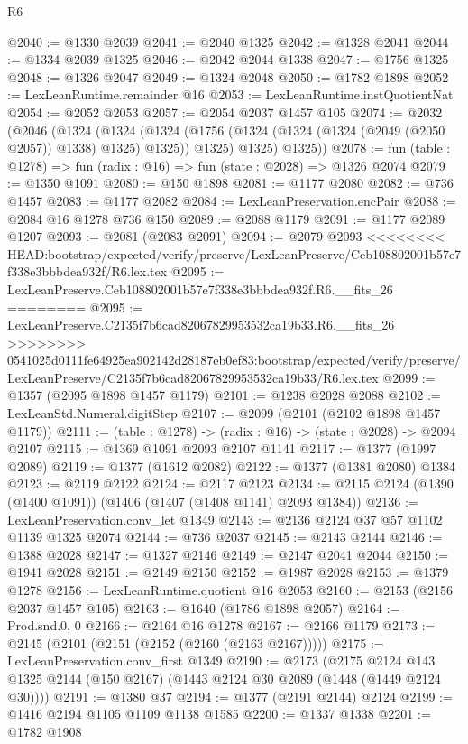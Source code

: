 \begin{lexlean}{R6}
\begin{coremodule}
{{{{{{{{{{{{{{{{{{{{{{{{{{{{{{{{{{{{{{{{{{{{{{{{{{@2040 := @1330 @2039
@2041 := @2040 @1325
@2042 := @1328 @2041
@2044 := @1334 @2039 @1325
@2046 := @2042 @2044 @1338
@2047 := @1756 @1325
@2048 := @1326 @2047
@2049 := @1324 @2048
@2050 := @1782 @1898
@2052 := LexLeanRuntime.remainder @16
@2053 := LexLeanRuntime.instQuotientNat
@2054 := @2052 @2053
@2057 := @2054 @2037 @1457 @105
@2074 := @2032
    (@2046
      (@1324
        (@1324
          (@1324 (@1756 (@1324 (@1324 (@1324 (@2049 (@2050 @2057)) @1338) @1325) @1325)) @1325)
          @1325)
        @1325))
@2078 := fun (table : @1278) => fun (radix : @16) => fun (state : @2028) => @1326 @2074
@2079 := @1350 @1091
@2080 := @150 @1898
@2081 := @1177 @2080
@2082 := @736 @1457
@2083 := @1177 @2082
@2084 := LexLeanPreservation.encPair
@2088 := @2084 @16 @1278 @736 @150
@2089 := @2088 @1179
@2091 := @1177 @2089 @1207
@2093 := @2081 (@2083 @2091)
@2094 := @2079 @2093
<<<<<<<< HEAD:bootstrap/expected/verify/preserve/LexLeanPreserve/Ceb108802001b57e7f338e3bbbdea932f/R6.lex.tex
@2095 := LexLeanPreserve.Ceb108802001b57e7f338e3bbbdea932f.R6.__fits_26
========
@2095 := LexLeanPreserve.C2135f7b6cad82067829953532ca19b33.R6.__fits_26
>>>>>>>> 0541025d0111fe64925ea902142d28187eb0ef83:bootstrap/expected/verify/preserve/LexLeanPreserve/C2135f7b6cad82067829953532ca19b33/R6.lex.tex
@2099 := @1357 (@2095 @1898 @1457 @1179)
@2101 := @1238 @2028 @2088
@2102 := LexLeanStd.Numeral.digitStep
@2107 := @2099 (@2101 (@2102 @1898 @1457 @1179))
@2111 := (table : @1278) -> (radix : @16) -> (state : @2028) -> @2094 @2107
@2115 := @1369 @1091 @2093 @2107 @1141
@2117 := @1377 (@1997 @2089)
@2119 := @1377 (@1612 @2082)
@2122 := @1377 (@1381 @2080) @1384
@2123 := @2119 @2122
@2124 := @2117 @2123
@2134 := @2115 @2124 (@1390 (@1400 @1091)) (@1406 (@1407 (@1408 @1141) @2093 @1384))
@2136 := LexLeanPreservation.conv_let @1349
@2143 := @2136 @2124 @37 @57 @1102 @1139 @1325 @2074
@2144 := @736 @2037
@2145 := @2143 @2144
@2146 := @1388 @2028
@2147 := @1327 @2146
@2149 := @2147 @2041 @2044
@2150 := @1941 @2028
@2151 := @2149 @2150
@2152 := @1987 @2028
@2153 := @1379 @1278
@2156 := LexLeanRuntime.quotient @16 @2053
@2160 := @2153 (@2156 @2037 @1457 @105)
@2163 := @1640 (@1786 @1898 @2057)
@2164 := Prod.snd.{0, 0}
@2166 := @2164 @16 @1278
@2167 := @2166 @1179
@2173 := @2145 (@2101 (@2151 (@2152 (@2160 (@2163 @2167)))))
@2175 := LexLeanPreservation.conv_first @1349
@2190 := @2173
    (@2175 @2124 @143 @1325 @2144 (@150 @2167) (@1443 @2124 @30 @2089 (@1448 (@1449 @2124 @30))))
@2191 := @1380 @37
@2194 := @1377 (@2191 @2144) @2124
@2199 := @1416 @2194 @1105 @1109 @1138 @1585
@2200 := @1337 @1338
@2201 := @1782 @1908
}}}}}}}}}}}}}}}}}}}}}}}}}}}}}}}}}}}}}}}}}}}}}}}}}}
\end{coremodule}
\end{lexlean}

